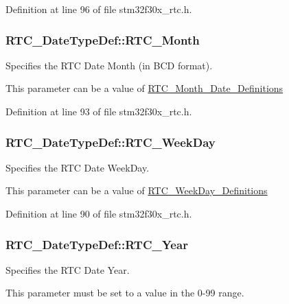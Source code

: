 Definition at line 96 of file stm32f30x\-\_\-rtc.\-h.

\hypertarget{struct_r_t_c___date_type_def_accc373bea0b7e29cdaafbb67215299ad}{
\subsubsection[{R\-T\-C\-\_\-\-Month}]{ R\-T\-C\-\_\-\-Date\-Type\-Def\-::\-R\-T\-C\-\_\-\-Month}}\label{struct_r_t_c___date_type_def_accc373bea0b7e29cdaafbb67215299ad}
\begin{DoxyVerb}       Specifies the RTC Date Month (in BCD format).
\end{DoxyVerb}
 This parameter can be a value of \hyperlink{group___r_t_c___month___date___definitions}{R\-T\-C\-\_\-\-Month\-\_\-\-Date\-\_\-\-Definitions} 

Definition at line 93 of file stm32f30x\-\_\-rtc.\-h.

\hypertarget{struct_r_t_c___date_type_def_acaa2b3da6492190d7d9d12a9c6bb85a7}{
\subsubsection[{R\-T\-C\-\_\-\-Week\-Day}]{ R\-T\-C\-\_\-\-Date\-Type\-Def\-::\-R\-T\-C\-\_\-\-Week\-Day}}\label{struct_r_t_c___date_type_def_acaa2b3da6492190d7d9d12a9c6bb85a7}
\begin{DoxyVerb}     Specifies the RTC Date WeekDay.
\end{DoxyVerb}
 This parameter can be a value of \hyperlink{group___r_t_c___week_day___definitions}{R\-T\-C\-\_\-\-Week\-Day\-\_\-\-Definitions} 

Definition at line 90 of file stm32f30x\-\_\-rtc.\-h.

\hypertarget{struct_r_t_c___date_type_def_a88d24df0c9b9c39fe4da76ec194272d3}{
\subsubsection[{R\-T\-C\-\_\-\-Year}]{ R\-T\-C\-\_\-\-Date\-Type\-Def\-::\-R\-T\-C\-\_\-\-Year}}\label{struct_r_t_c___date_type_def_a88d24df0c9b9c39fe4da76ec194272d3}
\begin{DoxyVerb}          Specifies the RTC Date Year.
\end{DoxyVerb}
 This parameter must be set to a value in the 0-\/99 range. 

